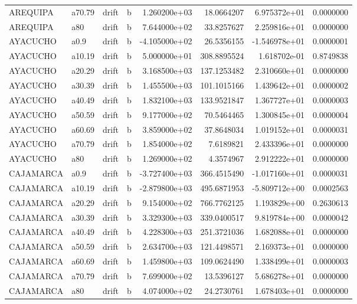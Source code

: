 \documentclass[
]{article}
\begin{document}
\begin{table}[!h]
\begin{tabular}[t]{llllrrrr}
AREQUIPA & a70.79 & drift & b & 1.260200e+03 & 18.0664207 & 6.975372e+01 & 0.0000000\\
AREQUIPA & a80 & drift & b & 7.644000e+02 & 33.8257627 & 2.259816e+01 & 0.0000000\\
\addlinespace
AYACUCHO & a0.9 & drift & b & -4.105000e+02 & 26.5356155 & -1.546978e+01 & 0.0000001\\
AYACUCHO & a10.19 & drift & b & 5.000000e+01 & 308.8895524 & 1.618702e-01 & 0.8749838\\
AYACUCHO & a20.29 & drift & b & 3.168500e+03 & 137.1253482 & 2.310660e+01 & 0.0000000\\
AYACUCHO & a30.39 & drift & b & 1.455500e+03 & 101.1015166 & 1.439642e+01 & 0.0000002\\
AYACUCHO & a40.49 & drift & b & 1.832100e+03 & 133.9521847 & 1.367727e+01 & 0.0000003\\
\addlinespace
AYACUCHO & a50.59 & drift & b & 9.177000e+02 & 70.5464465 & 1.300845e+01 & 0.0000004\\
AYACUCHO & a60.69 & drift & b & 3.859000e+02 & 37.8648034 & 1.019152e+01 & 0.0000031\\
AYACUCHO & a70.79 & drift & b & 1.854000e+02 & 7.6189821 & 2.433396e+01 & 0.0000000\\
AYACUCHO & a80 & drift & b & 1.269000e+02 & 4.3574967 & 2.912222e+01 & 0.0000000\\
CAJAMARCA & a0.9 & drift & b & -3.727400e+03 & 366.4515490 & -1.017160e+01 & 0.0000031\\
\addlinespace
CAJAMARCA & a10.19 & drift & b & -2.879800e+03 & 495.6871953 & -5.809712e+00 & 0.0002563\\
CAJAMARCA & a20.29 & drift & b & 9.154000e+02 & 766.7762125 & 1.193829e+00 & 0.2630613\\
CAJAMARCA & a30.39 & drift & b & 3.329300e+03 & 339.0400517 & 9.819784e+00 & 0.0000042\\
CAJAMARCA & a40.49 & drift & b & 4.228300e+03 & 251.3721036 & 1.682088e+01 & 0.0000000\\
CAJAMARCA & a50.59 & drift & b & 2.634700e+03 & 121.4498571 & 2.169373e+01 & 0.0000000\\
\addlinespace
CAJAMARCA & a60.69 & drift & b & 1.459800e+03 & 109.0624490 & 1.338499e+01 & 0.0000003\\
CAJAMARCA & a70.79 & drift & b & 7.699000e+02 & 13.5396127 & 5.686278e+01 & 0.0000000\\
CAJAMARCA & a80 & drift & b & 4.074000e+02 & 24.2730761 & 1.678403e+01 & 0.0000000\\

\end{tabular}
\end{table}
\end{document}
